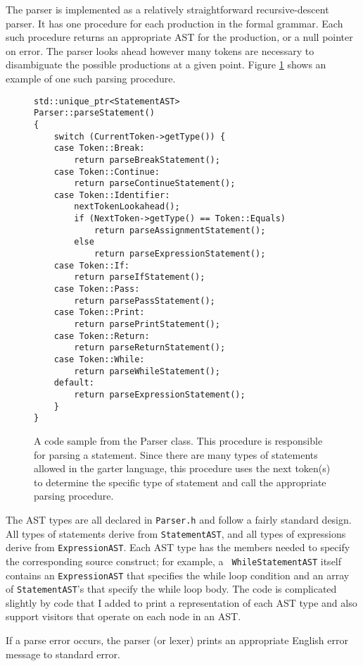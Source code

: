 \documentclass[11pt]{article}
\begin{document}
The parser is implemented as a relatively straightforward recursive-descent
parser.  It has one procedure for each production in the formal grammar.  Each
such procedure returns an appropriate AST for the production, or a null pointer
on error.  The parser looks ahead however many tokens are necessary to
disambiguate the possible productions at a given point.  Figure
\ref{fig:parseStatement} shows an example of one such parsing procedure.

\begin{figure}
\lstset{language=C++}
\begin{lstlisting}
std::unique_ptr<StatementAST>
Parser::parseStatement()
{
	switch (CurrentToken->getType()) {
	case Token::Break:
		return parseBreakStatement();
	case Token::Continue:
		return parseContinueStatement();
	case Token::Identifier:
		nextTokenLookahead();
		if (NextToken->getType() == Token::Equals)
			return parseAssignmentStatement();
		else
			return parseExpressionStatement();
	case Token::If:
		return parseIfStatement();
	case Token::Pass:
		return parsePassStatement();
	case Token::Print:
		return parsePrintStatement();
	case Token::Return:
		return parseReturnStatement();
	case Token::While:
		return parseWhileStatement();
	default:
		return parseExpressionStatement();
	}
}
\end{lstlisting}
\caption{A code sample from the Parser class.  This procedure is responsible for
parsing a statement.  Since there are many types of statements allowed in the
garter language, this procedure uses the next token(s) to determine the specific
type of statement and call the appropriate parsing procedure.  }
\label{fig:parseStatement}
\end{figure}

The AST types are all declared in {\tt Parser.h} and follow a fairly standard
design.  All types of statements derive from {\tt StatementAST}, and all types
of expressions derive from {\tt ExpressionAST}.  Each AST type has the members
needed to specify the corresponding source construct; for example, a {\tt
WhileStatementAST} itself contains an {\tt ExpressionAST} that specifies the
while loop condition and an array of {\tt StatementAST}'s that specify the while
loop body.  The code is complicated slightly by code that I added to print a
representation of each AST type and also support visitors that operate on each
node in an AST.

If a parse error occurs, the parser (or lexer) prints an appropriate English
error message to standard error.  
\end{document}
